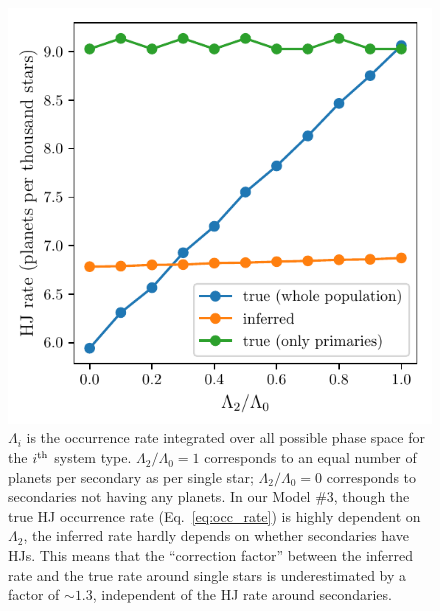 \begin{figure}[!tb]
    \centering
    \includegraphics[width=.9\textwidth]{figures/HJ_correction_inputrate_vs_HJratevalues.pdf}
    \caption{
    $\Lambda_i$ is the occurrence rate integrated over all possible phase 
    space for the $i^{\rm th}$ system type. $\Lambda_2/\Lambda_0=1$ 
    corresponds to an equal number of planets per secondary as per single star;
    $\Lambda_2/\Lambda_0=0$ corresponds to secondaries not having any planets.
    In our Model \#3, though the true HJ occurrence rate 
    (Eq.~\ref{eq:occ_rate}) is highly dependent on $\Lambda_2$, 
    the inferred rate hardly depends on whether secondaries have HJs.
    This means that the ``correction factor'' between the inferred rate and 
    the true rate around single stars is underestimated by a factor of 
    $\sim1.3$, independent of the HJ rate around secondaries.
    }
    \label{fig:HJ_correction_inputrate_vs_HJratevalues}
\end{figure}


